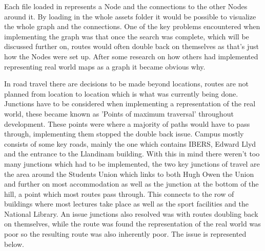 Each file loaded in represents a Node and the connections to the other Nodes around it. By loading in the whole assets folder it would be possible to visualize the whole graph and the connections. One of the key problems encountered when implementing the graph was that once the search was complete, which will be discussed further on, routes would often double back on themselves as that's just how the Nodes were set up. After some research on how others had implemented representing real world maps as a graph it became obvious why.

In road travel there are decisions to be made beyond locations, routes are not planned from location to location which is what was currently being done. Junctions have to be considered when implementing a representation of the real world, these became known as 'Points of maximum traversal' throughout development. These points were where a majority of paths would have to pass through, implementing them stopped the double back issue. Campus mostly consists of some key roads, mainly the one which contains IBERS, Edward Llyd and the entrance to the Llandinam building. With this in mind there weren't too many junctions which had to be implemented, the two key junctions of travel are the area around the Students Union which links to both Hugh Owen the Union and further on most accommodation as well as the junction at the bottom of the hill, a point which most routes pass through. This connects to the row of buildings where most lectures take place as well as the sport facilities and the National Library. An issue junctions also resolved was with routes doubling back on themselves, while the route was found the representation of the real world was poor so the resulting route was also inherently poor. The issue is represented below.

